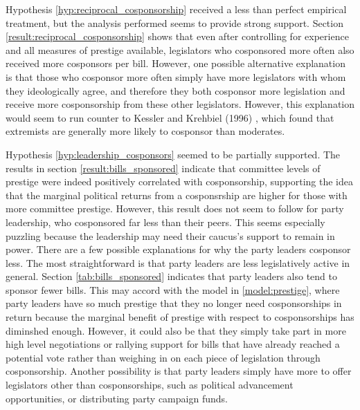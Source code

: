 \documentclass{article}
\begin{document}
  Hypothesis \ref{hyp:reciprocal_cosponsorship} received a less than perfect empirical treatment, but the analysis performed seems to provide strong support. Section \ref{result:reciprocal_cosponsorship} shows that even after controlling for experience and all measures of prestige available, legislators who cosponsored more often also received more cosponsors per bill. However, one possible alternative explanation is that those who cosponsor more often simply have more legislators with whom they ideologically agree, and therefore they both cosponsor more legislation and receive more cosponsorship from these other legislators. However, this explanation would seem to run counter to Kessler and Krehbiel (1996) \cite{kessler_krehbiel1996}, which found that extremists are generally more likely to cosponsor than moderates. 

  Hypothesis \ref{hyp:leadership_cosponsors} seemed to be partially supported. The results in section \ref{result:bills_sponsored} indicate that committee levels of prestige were indeed positively correlated with cosponsorship, supporting the idea that the marginal political returns from a cosponsrship are higher for those with more committee prestige. However, this result does not seem to follow for party leadership, who cosponsored far less than their peers. This seems especially puzzling because the leadership may need their caucus's support to remain in power. There are a few possible explanations for why the party leaders cosponsor less. The most straightforward is that party leaders are less legislatively active in general. Section \ref{tab:bills_sponsored} indicates that party leaders also tend to sponsor fewer bills. This may accord with the model in \ref{model:prestige}, where party leaders have so much prestige that they no longer need cosponsorships in return because the marginal benefit of prestige with respect to cosponsorships has diminshed enough. However, it could also be that they simply take part in more high level negotiations or rallying support for bills that have already reached a potential vote rather than weighing in on each piece of legislation through cosponsorship. Another possibility is that party leaders simply have more to offer legislators other than cosponsorships, such as political advancement opportunities, or distributing party campaign funds. 
\end{document}
